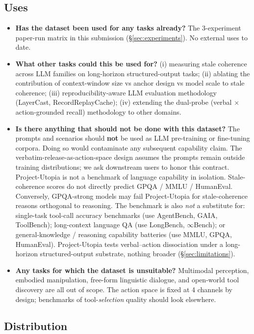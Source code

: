 \subsection{Uses}

\begin{itemize}[leftmargin=*]
\item \textbf{Has the dataset been used for any tasks already?}
The 3-experiment paper-run matrix in this submission
(\S\ref{sec:experiments}). No external uses to date.
\item \textbf{What other tasks could this be used for?}
(i) measuring stale coherence across LLM families on long-horizon
structured-output tasks; (ii) ablating the contribution of
context-window size vs anchor design vs model scale to stale
coherence; (iii) reproducibility-aware LLM evaluation methodology
(LayerCast, RecordReplayCache); (iv) extending the dual-probe
(verbal $\times$ action-grounded recall) methodology to other
domains.
\item \textbf{Is there anything that should not be done with
this dataset?}
The prompts and scenarios should \textbf{not} be used as
LLM pre-training or fine-tuning corpora. Doing so would
contaminate any subsequent capability claim. The
verbatim-release-as-action-space design assumes the prompts
remain outside training distributions; we ask downstream
users to honor this contract.
Project-Utopia is not a benchmark of language capability in
isolation. Stale-coherence scores do not directly predict
GPQA / MMLU / HumanEval. Conversely, GPQA-strong models may
fail Project-Utopia for stale-coherence reasons orthogonal to
reasoning. The benchmark is also \emph{not} a substitute for:
single-task tool-call accuracy benchmarks (use AgentBench,
GAIA, ToolBench); long-context language QA (use LongBench,
$\infty$Bench); or general-knowledge / reasoning capability
batteries (use MMLU, GPQA, HumanEval). Project-Utopia tests
verbal--action dissociation under a long-horizon
structured-output substrate, nothing broader
(\S\ref{sec:limitations}).
\item \textbf{Any tasks for which the dataset is unsuitable?}
Multimodal perception, embodied manipulation, free-form
linguistic dialogue, and open-world tool discovery are all
out of scope. The action space is fixed at 4 channels by
design; benchmarks of tool-\emph{selection} quality should
look elsewhere.
\end{itemize}

\subsection{Distribution}

